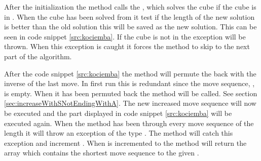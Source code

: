 After the initialization the  method calls the , which solves the cube if the cube is in . 
When the cube has been solved from  it test if the length of the new solution is better than the old solution this will be saved as the new solution. 
This can be seen in code snippet \ref{src:kociemba}.
If the cube is not in   the exception  will be thrown.
When this exception is caught it forces the  method to skip to the next part of the algorithm. 
\begin{comment}
 method to test if the cube is in \m{H}. 
 The method \vr{solveFromH} is called with a parameter, which determines how deep it will search.

If the \rubik{} is in \m{H} then \vr{solveFromH} will start solving it with \m{A} moves. If the \rubik{} is not inside \m{H} the \vr{solveFromH} will throw an exception called \vr{InvalidCubeException}. 

When the InvalidCubeException is caught by it cause 

\end{comment}

After the code snippet \ref{src:kociemba} the method will permute the \rubik{} back with the inverse of the last move. In first run this is redundant since the move sequence, , is empty. 
When it has been permuted back the method  will be called. 
See section \ref{sec:increaseWithSNotEndingWithA}. 
The new increased move sequence will now be executed and the part displayed in code snippet \ref{src:kociemba} will be executed again. 
When the method  has been through every move sequence of the length  it will throw an exception of the type  . 
The  method will catch this exception and increment . When  is incremented to  the method will return the array  which contains the shortest move sequence to the given \rubik{}.  
\begin{comment}
Thereafter it tests if \vr{d + c.length} > \vr{l}. 
If that is true, \vr{l} will be set equal to the sum of \vr{d + c.length} and the \vr{result} array will be initialized with the size \vr{l}. 
In the \vr{result} array the move sequence \vr{b} and the move sequence \vr{c} is added and the console will print the current \vr{result} and the time it took in seconds.

After the method has tested if \vr{d + c.length < l} the method will permute the \rubik{} back with the inverse of the last move. When it has been permuted the method \vr{increaseWithSNotEndingWithA} will be called. See section \ref{sec:increaseWithSNotEndingWithA}.

When the method \vr{increaseWithSNotEndingWithA} throws an exception of the type \vr{UnableToIncreaseMoveSequenceException} the method increments \vr{d}. 
When \vr{d} is incremented to \vr{l} the method will return the \vr{result} array.
\end{comment}